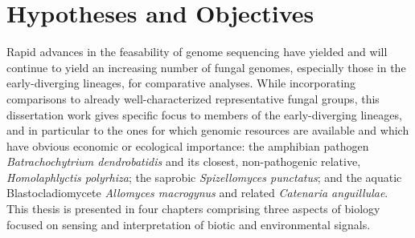 \section{Hypotheses and Objectives}
\indent Rapid advances in the feasability of genome sequencing have yielded and will continue to yield an increasing number of fungal genomes, especially those in the early-diverging lineages, for comparative analyses. While incorporating comparisons to already well-characterized representative fungal groups, this dissertation work gives specific focus to members of the early-diverging lineages, and in particular to the ones for which genomic resources are available and which have obvious economic or ecological importance: the amphibian pathogen \textit{Batrachochytrium dendrobatidis} and its closest, non-pathogenic relative, \textit{Homolaphlyctis polyrhiza}; the saprobic \textit{Spizellomyces punctatus}; and the aquatic Blastocladiomycete \textit{Allomyces macrogynus} and related \textit{Catenaria anguillulae}. This thesis is presented in four chapters comprising three aspects of biology focused on sensing and interpretation of biotic and environmental signals.\\
